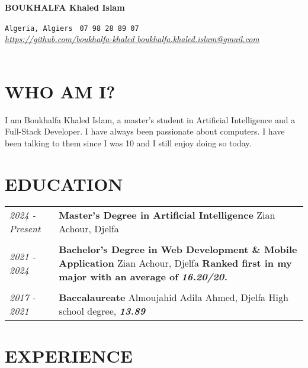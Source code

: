 \documentclass[a4paper,12pt]{article}
\begin{document}
\begin{center}
     \Huge{\textbf{BOUKHALFA Khaled Islam}}
\end{center}

\texttt{Algeria, Algiers }  \hfill \texttt{07 98 28 89 07 } \\
 \href{https://github.com/boukhalfa-khaled}{\textit{ https://github.com/boukhalfa-khaled }}\hfill \href{mailto:boukhalfa.khaled.islam@gmail.com}{\textit{ boukhalfa.khaled.islam@gmail.com }} \\ 
\\ 

\section{WHO AM I?}
I am Boukhalfa Khaled Islam, a master's student in Artificial Intelligence and a Full-Stack Developer. I have always been passionate about computers. I have been talking to them since I was 10 and I still enjoy doing so today.

\section{EDUCATION}
\begin{tabular}{ l p{15in} }
  
    \textit{2024 - Present} & \textbf{Master's Degree in Artificial Intelligence}
    \newline Zian Achour, Djelfa
    \\
    \\

    \textit{2021 - 2024} & \textbf{Bachelor's Degree in Web Development \& Mobile Application}
    \newline Zian Achour, Djelfa
    \newline \textbf{Ranked first in my major with an average of } \textbf{\textit{16.20/20.}}   \\
    \\

    \textit{2017 - 2021 }& \textbf{Baccalaureate}
    \newline Almoujahid Adila Ahmed, Djelfa
    \newline High school degree, \textbf{\textit{13.89}} \\
\end{tabular}

\section{EXPERIENCE}
\end{document}
